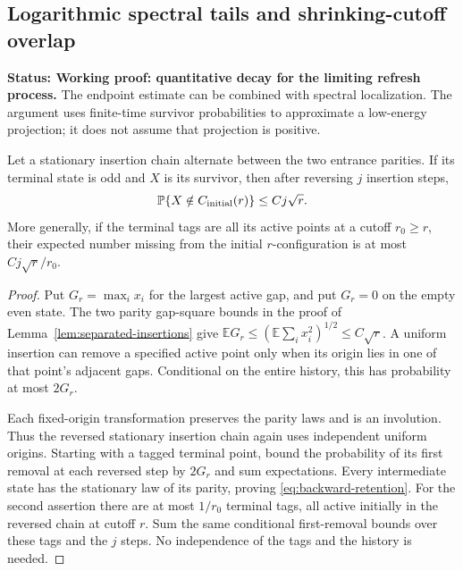 \documentclass[11pt,letterpaper]{article}
\newcommand{\PP}{\mathbb P}\newcommand{\EE}{\mathbb E}
\newcommand{\status}[1]{\textbf{Status: #1.}}
\begin{document}
\subsection{Logarithmic spectral tails and shrinking-cutoff overlap}
\label{sec:spectral-rate}

\status{Working proof: quantitative decay for the limiting refresh process}
The endpoint estimate can be combined with spectral localization.
The argument uses finite-time survivor probabilities to approximate
a low-energy projection; it does not assume that projection is positive.

\begin{lemma}
\label{lem:backward-retention}
Let a stationary insertion chain alternate between the two entrance
parities. If its terminal state is odd and $X$ is its survivor, then
after reversing $j$ insertion steps,
\begin{equation}\label{eq:backward-retention}
 \PP\{X\notin C_{\rm initial}(r)\}\le Cj\sqrt r.
\end{equation}
More generally, if the terminal tags are all its active points at a
cutoff $r_0\ge r$, their expected number missing from the initial
$r$-configuration is at most $Cj\sqrt r/r_0$.
\end{lemma}
\begin{proof}
Put $G_r=\max_i x_i$ for the largest active gap, and put $G_r=0$
on the empty even state. The two parity gap-square bounds in the
proof of Lemma~\ref{lem:separated-insertions} give
$\EE G_r\le(\EE\sum_i x_i^2)^{1/2}\le C\sqrt r$.
A uniform insertion can remove a specified active point only when
its origin lies in one of that point's adjacent gaps. Conditional on
the entire history, this has probability at most $2G_r$.

Each fixed-origin transformation preserves the parity laws and is an
involution. Thus the reversed stationary insertion chain again uses
independent uniform origins. Starting with a tagged terminal point,
bound the probability of its first removal at each reversed step by
$2G_r$ and sum expectations. Every intermediate state has the
stationary law of its parity, proving \eqref{eq:backward-retention}.
For the second assertion there are at most $1/r_0$ terminal tags,
all active initially in the reversed chain at cutoff $r$. Sum the
same conditional first-removal bounds over these tags and the $j$
steps. No independence of the tags and the history is needed.
\end{proof}
\end{document}
